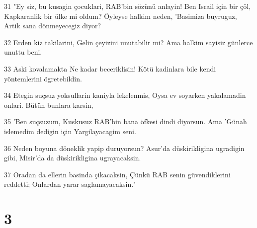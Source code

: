 \par 31 "Ey siz, bu kusagin çocuklari, RAB'bin sözünü anlayin! Ben Israil için bir çöl, Kapkaranlik bir ülke mi oldum? Öyleyse halkim neden, 'Basimiza buyruguz, Artik sana dönmeyecegiz diyor?
\par 32 Erden kiz takilarini, Gelin çeyizini unutabilir mi? Ama halkim sayisiz günlerce unuttu beni.
\par 33 Aski kovalamakta Ne kadar beceriklisin! Kötü kadinlara bile kendi yöntemlerini ögretebildin.
\par 34 Etegin suçsuz yoksullarin kaniyla lekelenmis, Oysa ev soyarken yakalamadin onlari. Bütün bunlara karsin,
\par 35 'Ben suçsuzum, Kuskusuz RAB'bin bana öfkesi dindi diyorsun. Ama 'Günah islemedim dedigin için Yargilayacagim seni.
\par 36 Neden boyuna döneklik yapip duruyorsun? Asur'da düskirikligina ugradigin gibi, Misir'da da düskirikligina ugrayacaksin.
\par 37 Oradan da ellerin basinda çikacaksin, Çünkü RAB senin güvendiklerini reddetti; Onlardan yarar saglamayacaksin."

\chapter{3}

